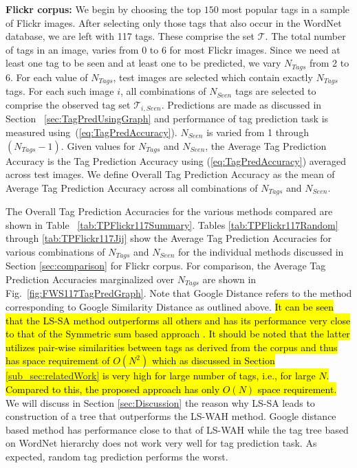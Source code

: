 \textbf{Flickr corpus:} We begin by choosing  the top $150$ most popular tags in a sample of Flickr images. After selecting only those tags that also occur in the WordNet database, we are left with 117 tags. These comprise the set $\mathcal{T}$. The total number of tags in an image, varies from 0 to 6 for most Flickr images. Since we need at least one tag to be seen and at least one to be predicted, we vary $N_{Tags}$  from 2 to 6. For each value of $N_{Tags}$, test images are selected which contain exactly $N_{Tags}$ tags. For each such image $i$, all combinations of $N_{Seen}$ tags are selected to comprise the observed tag set $\mathcal{T}_{i,Seen}$. Predictions are made as discussed in Section ~\ref{sec:TagPredUsingGraph} and performance of tag prediction task is measured using~(\ref{eq:TagPredAccuracy}). $N_{Seen}$ is varied from 1 through $(N_{Tags} - 1)$. Given values for $N_{Tags}$ and $N_{Seen}$, the Average Tag Prediction Accuracy is the Tag Prediction Accuracy using (\ref{eq:TagPredAccuracy}) averaged across test images. We define Overall Tag Prediction Accuracy as the mean of Average Tag Prediction Accuracy across all combinations of $N_{Tags}$ and $N_{Seen}$. 

The Overall Tag Prediction Accuracies for the various methods compared are shown in Table ~\ref{tab:TPFlickr117Summary}. Tables \ref{tab:TPFlickr117Random} through \ref{tab:TPFlickr117Jij} show the Average Tag Prediction Accuracies for various combinations of $N_{Tags}$ and $N_{Seen}$ for the individual methods discussed in Section \ref{sec:comparison} for Flickr corpus. For comparison, the Average Tag Prediction Accuracies marginalized over $N_{Tags}$ are shown in Fig.~\ref{fig:FWS117TagPredGraph}. Note that Google Distance refers to the method corresponding to Google Similarity Distance as outlined above. \hl{It can be seen that the LS-SA method outperforms all others and has its performance very close to that of the Symmetric sum based approach {\cite{sigurbjornsson2008flickr}}. It should be noted that the latter utilizes pair-wise similarities between tags as derived from the corpus and thus has space requirement of $O(N^2)$ which as discussed in Section {\ref{sub_sec:relatedWork}} is very high for large number of tags, i.e., for large $N$. Compared to this, the proposed approach has only $O(N)$ space requirement. } We will discuss in Section \ref{sec:Discussion} the reason why LS-SA leads to construction of a tree that outperforms the LS-WAH method. Google distance based method has performance close to that of LS-WAH while the tag tree based on WordNet hierarchy does not work very well for tag prediction task. As expected, random tag prediction performs the worst.

